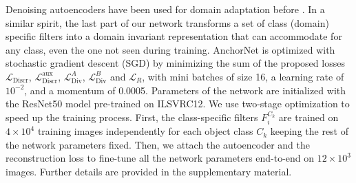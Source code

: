 \documentclass[10pt,twocolumn,letterpaper]{article}
\newcommand{\myparagraph}[1]{\vspace{0.15cm}\noindent\textbf{#1.}}
\begin{document}
Denoising autoencoders have been used for domain adaptation before \cite{chen2012marginalized,glorot2011domain}. In a similar spirit, the last part of our network transforms a set of class (domain) specific filters into a domain invariant representation that can accommodate for any class, even the one not seen during training. %
AnchorNet is optimized with stochastic gradient descent (SGD) by minimizing
the sum of the proposed losses
$\mathcal{L}_{\text{Discr}}$, $\mathcal{L}_{\text{Discr}}^{\text{aux}}$, $\mathcal{L}_{\text{Div}}^A$, $\mathcal{L}_{\text{Div}}^B$ and $\mathcal{L}_{R}$,
with mini batches of size 16, a learning rate of $10^{-2}$, and a momentum of 0.0005.
Parameters of the network are initialized with the ResNet50 model pre-trained on ILSVRC12.
We use two-stage optimization to speed up the training process.
First, the class-specific filters $F_i^{C_k}$ are trained on $4\times10^4$ training images independently for each
object class $C_k$ keeping the rest of the network parameters fixed.
Then, we attach the autoencoder and the reconstruction loss to fine-tune all the network parameters end-to-end on $12\times10^3$ images.
Further details are provided in the supplementary material.
\end{document}
